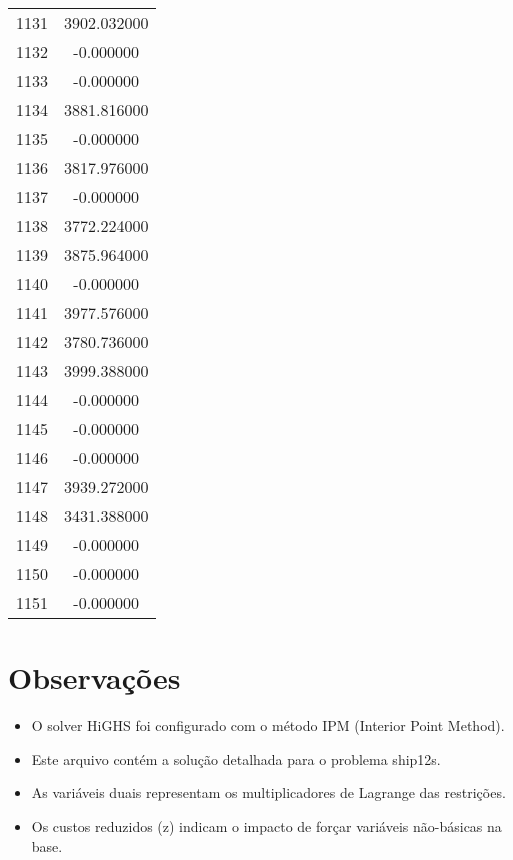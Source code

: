 \documentclass[12pt]{article}
\begin{document}
\begin{longtable}{@{}cc@{}}
1131 & 3902.032000 \\
1132 & -0.000000 \\
1133 & -0.000000 \\
1134 & 3881.816000 \\
1135 & -0.000000 \\
1136 & 3817.976000 \\
1137 & -0.000000 \\
1138 & 3772.224000 \\
1139 & 3875.964000 \\
1140 & -0.000000 \\
1141 & 3977.576000 \\
1142 & 3780.736000 \\
1143 & 3999.388000 \\
1144 & -0.000000 \\
1145 & -0.000000 \\
1146 & -0.000000 \\
1147 & 3939.272000 \\
1148 & 3431.388000 \\
1149 & -0.000000 \\
1150 & -0.000000 \\
1151 & -0.000000 \\

\end{longtable}


\section{Observações}

\begin{itemize}
\item O solver HiGHS foi configurado com o método IPM (Interior Point Method).
\item Este arquivo contém a solução detalhada para o problema ship12s.
\item As variáveis duais representam os multiplicadores de Lagrange das restrições.
\item Os custos reduzidos (z) indicam o impacto de forçar variáveis não-básicas na base.
\end{itemize}
\end{document}
